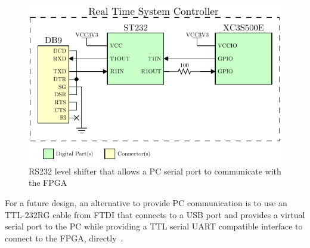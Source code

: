 \begin{figure}[H]
	\centering 
		\includegraphics{./figures/RS232} 
	\caption{RS232 level shifter that allows a PC serial port to communicate with the FPGA~\cite{DigilentNexys2rm,DigilentNexys2sch}\label{fig:RS232}}
\end{figure}

For a future design, an alternative to provide PC communication is to use an TTL-232RG cable from FTDI that connects to a USB port and provides a virtual serial port to the PC while providing a TTL serial UART compatible interface to connect to the FPGA, directly~\cite{FTDIUSBSerial}.



